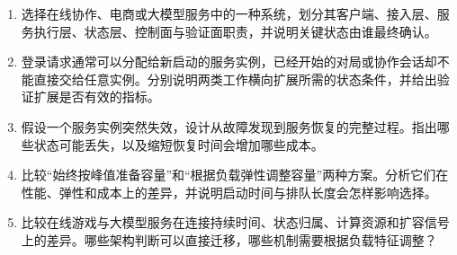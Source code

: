 \begin{tcolorbox}[breakable]
\begin{enumerate}
    \item 选择在线协作、电商或大模型服务中的一种系统，划分其客户端、接入层、服务执行层、状态层、控制面与验证面职责，并说明关键状态由谁最终确认。
    \item 登录请求通常可以分配给新启动的服务实例，已经开始的对局或协作会话却不能直接交给任意实例。分别说明两类工作横向扩展所需的状态条件，并给出验证扩展是否有效的指标。
    \item 假设一个服务实例突然失效，设计从故障发现到服务恢复的完整过程。指出哪些状态可能丢失，以及缩短恢复时间会增加哪些成本。
    \item 比较“始终按峰值准备容量”和“根据负载弹性调整容量”两种方案。分析它们在性能、弹性和成本上的差异，并说明启动时间与排队长度会怎样影响选择。
    \item 比较在线游戏与大模型服务在连接持续时间、状态归属、计算资源和扩容信号上的差异。哪些架构判断可以直接迁移，哪些机制需要根据负载特征调整？
\end{enumerate}
\end{tcolorbox}

\newpage
